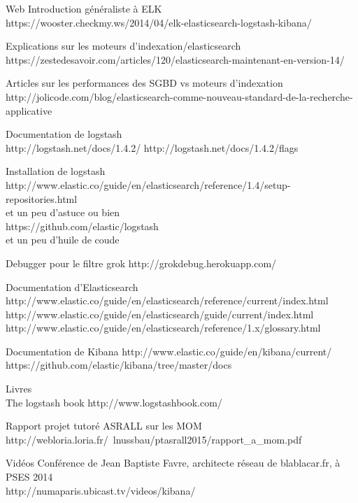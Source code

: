 Web
Introduction généraliste à ELK \\

https://wooster.checkmy.ws/2014/04/elk-elasticsearch-logstash-kibana/

Explications sur les moteurs d'indexation/elasticsearch\\
https://zestedesavoir.com/articles/120/elasticsearch-maintenant-en-version-14/

Articles sur les performances des SGBD vs moteurs d'indexation
http://jolicode.com/blog/elasticsearch-comme-nouveau-standard-de-la-recherche-applicative


Documentation de logstash\\
http://logstash.net/docs/1.4.2/
http://logstash.net/docs/1.4.2/flags

Installation de logstash
http://www.elastic.co/guide/en/elasticsearch/reference/1.4/setup-repositories.html
\\ et un peu d'astuce ou bien \\
https://github.com/elastic/logstash
\\ et un peu d'huile de coude


Debugger pour le filtre grok
http://grokdebug.herokuapp.com/


Documentation d'Elasticsearch\\
http://www.elastic.co/guide/en/elasticsearch/reference/current/index.html\\
http://www.elastic.co/guide/en/elasticsearch/guide/current/index.html
http://www.elastic.co/guide/en/elasticsearch/reference/1.x/glossary.html



Documentation de Kibana
http://www.elastic.co/guide/en/kibana/current/
https://github.com/elastic/kibana/tree/master/docs


Livres\\
The logstash book
http://www.logstashbook.com/

Rapport projet tutoré ASRALL sur les MOM
http://webloria.loria.fr/~lnussbau/ptasrall2015/rapport\_a\_mom.pdf


Vidéos
Conférence de Jean Baptiste Favre, architecte réseau de blablacar.fr, à PSES 2014\\
http://numaparis.ubicast.tv/videos/kibana/
